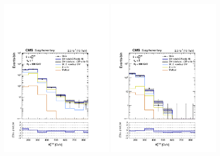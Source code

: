 \clearpage
\begin{figure}[!h]
  \begin{center}
    \includegraphics[width=0.49\textwidth]{Supplementary/aggregated_mhtShape_le1b_ge3a_200_Inf_crfit_aux.pdf} 
    \includegraphics[width=0.49\textwidth]{Supplementary/aggregated_mhtShape_ge2b_ge3a_200_Inf_crfit_aux.pdf} \\
    \caption{
      \label{fig:aggr_asym} 
    }
  \end{center}
\end{figure}

